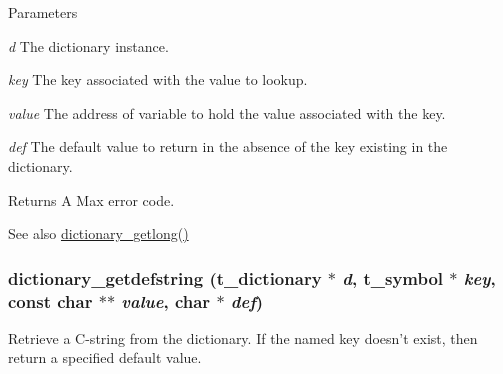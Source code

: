 \begin{DoxyParams}{Parameters}
\item[{\em d}]The dictionary instance. \item[{\em key}]The key associated with the value to lookup. \item[{\em value}]The address of variable to hold the value associated with the key. \item[{\em def}]The default value to return in the absence of the key existing in the dictionary. \end{DoxyParams}
\begin{DoxyReturn}{Returns}
A Max error code.
\end{DoxyReturn}
\begin{DoxySeeAlso}{See also}
\hyperlink{group__dictionary_gafd215503871278e2ae02c1c747f39e46}{dictionary\_\-getlong()} 
\end{DoxySeeAlso}
\hypertarget{group__dictionary_ga3ced9bab630a199d920fffc163f4fe1b}{
\subsubsection[{dictionary\_\-getdefstring}]{ dictionary\_\-getdefstring ({\bf t\_\-dictionary} $\ast$ {\em d}, \/  {\bf t\_\-symbol} $\ast$ {\em key}, \/  const char $\ast$$\ast$ {\em value}, \/  char $\ast$ {\em def})}}
\label{group__dictionary_ga3ced9bab630a199d920fffc163f4fe1b}


Retrieve a C-\/string from the dictionary. If the named key doesn't exist, then return a specified default value.


